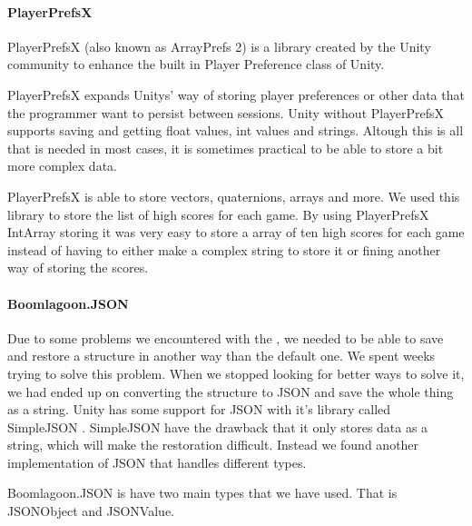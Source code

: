 \paragraph{PlayerPrefsX}
PlayerPrefsX (also known as ArrayPrefs 2)\cite{PlayerPrefsX} is a library created by the Unity community to enhance the built in Player Preference class of Unity.

PlayerPrefsX expands Unitys' way of storing player preferences or other data that the programmer want to persist between sessions.
Unity without PlayerPrefsX supports saving and getting float values, int values and strings. Altough this is all that is needed in most cases, it is sometimes practical to be able to store a bit more complex data.

PlayerPrefsX is able to store vectors, quaternions, arrays and more. 
We used this library to store the list of high scores for each game. 
By using PlayerPrefsX IntArray storing it was very easy to store a array of ten high scores for each game instead of having to either make a complex string to store it or fining another way of storing the scores.

\paragraph{Boomlagoon.{JSON}}
Due to some problems we encountered with the ,
we needed to be able to save and restore a structure in another way than the
default one. We spent weeks trying to solve this problem. When we stopped
looking for better ways to solve it, we had ended up on converting the 
structure to {JSON} and save the whole thing as a string.
Unity has some support for {JSON} with it's library called Simple{JSON} 
\cite{SimpleJSON}. Simple{JSON} have the drawback that it only stores data
as a string, which will make the restoration difficult. Instead we found
another implementation of JSON that handles different types.

Boomlagoon.{JSON} is have two main types that we have used. That is 
{JSONO}bject and {JSONV}alue.
